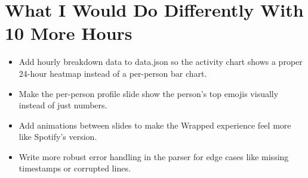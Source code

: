 \documentclass{report}
\begin{document}
\section{What I Would Do Differently With 10 More Hours}

\begin{itemize}
    \item Add hourly breakdown data to data.json so the activity chart shows a proper 24-hour heatmap instead of a per-person bar chart.
    \item Make the per-person profile slide show the person's top emojis visually instead of just numbers.
    \item Add animations between slides to make the Wrapped experience feel more like Spotify's version.
    \item Write more robust error handling in the parser for edge cases like missing timestamps or corrupted lines.
\end{itemize}



\end{document}
